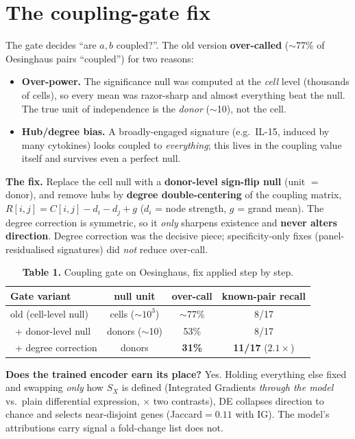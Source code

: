\documentclass[11pt]{article}
\begin{document}
\section{The coupling-gate fix}\label{sec:gate-fix}
The gate decides ``are $a,b$ coupled?''. The old version \textbf{over-called} ($\sim$77\% of
Oesinghaus pairs ``coupled'') for two reasons:
\begin{itemize}
\item \textbf{Over-power.} The significance null was computed at the \emph{cell} level (thousands
of cells), so every mean was razor-sharp and almost everything beat the null. The true unit of
independence is the \emph{donor} ($\sim$10), not the cell.
\item \textbf{Hub/degree bias.} A broadly-engaged signature (e.g.\ IL-15, induced by many
cytokines) looks coupled to \emph{everything}; this lives in the coupling value itself and
survives even a perfect null.
\end{itemize}
\textbf{The fix.} Replace the cell null with a \textbf{donor-level sign-flip null} (unit $=$
donor), and remove hubs by \textbf{degree double-centering} of the coupling matrix,
$R[i,j]=C[i,j]-d_i-d_j+g$ ($d_i$ = node strength, $g$ = grand mean). The degree correction is
symmetric, so it \emph{only} sharpens existence and \textbf{never alters direction}. Degree
correction was the decisive piece; specificity-only fixes (panel-residualised signatures) did
\emph{not} reduce over-call.

\begin{table}[h]\centering\small
\caption*{\textbf{Table 1.} Coupling gate on Oesinghaus, fix applied step by step.}
\begin{tabular}{lccc}
\toprule
Gate variant & null unit & over-call & known-pair recall \\
\midrule
old (cell-level null) & cells ($\sim10^3$) & $\sim$77\% & 8/17 \\
\ + donor-level null & donors ($\sim$10) & 53\% & 8/17 \\
\rowcolor{hl}\ + degree correction & donors & \textbf{31\%} & \textbf{11/17} ($2.1\times$) \\
\bottomrule
\end{tabular}
\end{table}

\textbf{Does the trained encoder earn its place?} Yes. Holding everything else fixed and swapping
\emph{only} how $S_X$ is defined (Integrated Gradients \emph{through the model} vs.\ plain
differential expression, $\times$ two contrasts), DE collapses direction to chance and selects
near-disjoint genes (Jaccard$=0.11$ with IG). The model's attributions carry signal a fold-change
list does not.
\end{document}
